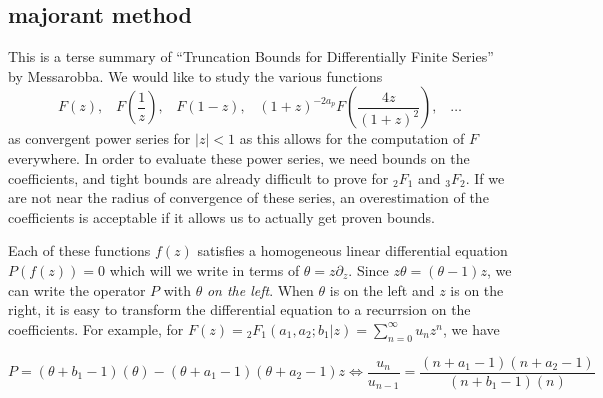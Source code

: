 \documentclass[12pt]{article}
\numberwithin{equation}{section}
\newcommand{\FFf}[5] {{}_{#1}{#2}_{#3} \left(#4 | {#5} \right)}
\begin{document}
\subsection{majorant method}

This is a terse summary of ``Truncation Bounds for Differentially Finite Series'' by Messarobba. We would like to study the various functions
\begin{equation*}
F\left(z\right)\text{,} \quad F\left(\frac{1}{z}\right)\text{,} \quad F\left(1-z\right)\text{,} \quad  (1+z)^{-2a_p} F\left(\frac{4z}{(1+z)^2}\right)\text{,} \quad \dots
\end{equation*}
as convergent power series for $|z|<1$ as this allows for the computation of $F$ everywhere. In order to evaluate these power series, we need bounds on the coefficients, and tight bounds are already difficult to prove for ${}_2 F_1$ and ${}_3 F_2$. If we are not near the radius of convergence of these series, an overestimation of the coefficients is acceptable if it allows us to actually get proven bounds.

Each of these functions $f(z)$ satisfies a homogeneous linear differential equation $P(f(z))=0$ which will we write in terms of $\theta = z \partial_z$. Since $z\theta = (\theta - 1)z$, we can write the operator $P$ with $\theta$ \emph{on the left}. When $\theta$ is on the left and $z$ is on the right, it is easy to transform the differential equation to a recurrsion on the coefficients. For example, for $F(z) = \FFf{2}{F}{1}{a_1,a_2;b_1}{z} = \sum_{n=0}^{\infty}{u_n} z^n$, we have

\begin{equation*}
P = (\theta+b_1-1)(\theta) - (\theta+a_1-1)(\theta+a_2-1)z \Leftrightarrow \frac{u_n}{u_{n-1}} = \frac{(n+a_1-1)(n+a_2-1)}{(n+b_1-1)(n)}
\end{equation*}
\end{document}
